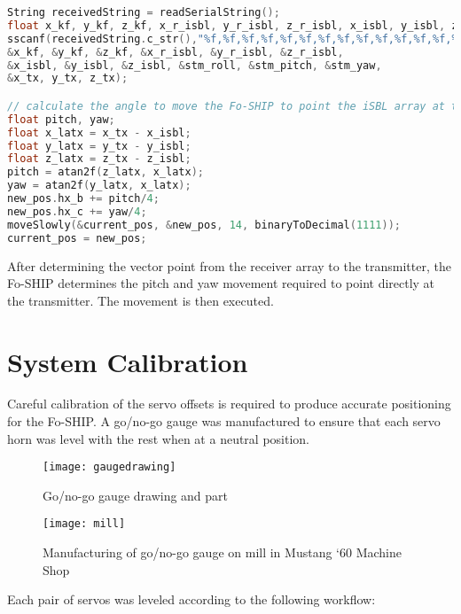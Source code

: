 \documentclass[11pt]{ucthesisCP}
\begin{document}
\begin{lstlisting}[language=C++]
String receivedString = readSerialString();
float x_kf, y_kf, z_kf, x_r_isbl, y_r_isbl, z_r_isbl, x_isbl, y_isbl, z_isbl, stm_roll, stm_pitch, stm_yaw, x_tx, y_tx, z_tx;
sscanf(receivedString.c_str(),"%f,%f,%f,%f,%f,%f,%f,%f,%f,%f,%f,%f,%f,%f,%f", 
&x_kf, &y_kf, &z_kf, &x_r_isbl, &y_r_isbl, &z_r_isbl, 
&x_isbl, &y_isbl, &z_isbl, &stm_roll, &stm_pitch, &stm_yaw,
&x_tx, y_tx, z_tx);

// calculate the angle to move the Fo-SHIP to point the iSBL array at the transmitter
float pitch, yaw;
float x_latx = x_tx - x_isbl;
float y_latx = y_tx - y_isbl;
float z_latx = z_tx - z_isbl;
pitch = atan2f(z_latx, x_latx);
yaw = atan2f(y_latx, x_latx);
new_pos.hx_b += pitch/4;
new_pos.hx_c += yaw/4;
moveSlowly(&current_pos, &new_pos, 14, binaryToDecimal(1111));
current_pos = new_pos;
\end{lstlisting}

After determining the vector point from the receiver array to the transmitter, the Fo-SHIP determines the pitch and yaw movement required to point directly at the transmitter. The movement is then executed.

\section{System Calibration} \label{sec:2s6}
Careful calibration of the servo offsets is required to produce accurate positioning for the Fo-SHIP. A go/no-go gauge was manufactured to ensure that each servo horn was level with the rest when at a neutral position.

\begin{figure}[htbp]
	\centering
	\texttt{[image: gaugedrawing]}
	\caption{Go/no-go gauge drawing and part}
	\label{fig:gaugedrawing}
\end{figure}

\begin{figure}[htbp]
	\centering
	\texttt{[image: mill]}
	\caption{Manufacturing of go/no-go gauge on mill in Mustang ‘60 Machine Shop}
	\label{fig:mill}
\end{figure}

\noindent Each pair of servos was leveled according to the following workflow:
\end{document}
